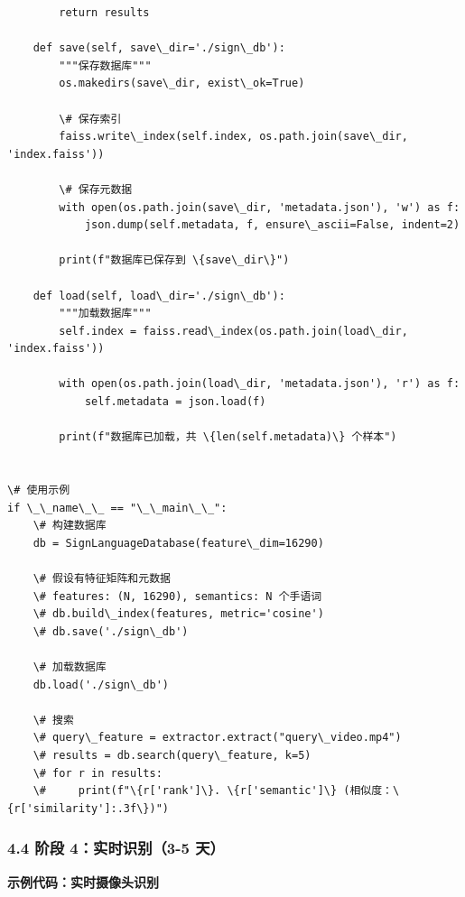 \documentclass[a4paper,12pt]{article}
\begin{document}
\begin{verbatim}
        return results
    
    def save(self, save\_dir='./sign\_db'):
        """保存数据库"""
        os.makedirs(save\_dir, exist\_ok=True)
        
        \# 保存索引
        faiss.write\_index(self.index, os.path.join(save\_dir, 'index.faiss'))
        
        \# 保存元数据
        with open(os.path.join(save\_dir, 'metadata.json'), 'w') as f:
            json.dump(self.metadata, f, ensure\_ascii=False, indent=2)
        
        print(f"数据库已保存到 \{save\_dir\}")
    
    def load(self, load\_dir='./sign\_db'):
        """加载数据库"""
        self.index = faiss.read\_index(os.path.join(load\_dir, 'index.faiss'))
        
        with open(os.path.join(load\_dir, 'metadata.json'), 'r') as f:
            self.metadata = json.load(f)
        
        print(f"数据库已加载，共 \{len(self.metadata)\} 个样本")


\# 使用示例
if \_\_name\_\_ == "\_\_main\_\_":
    \# 构建数据库
    db = SignLanguageDatabase(feature\_dim=16290)
    
    \# 假设有特征矩阵和元数据
    \# features: (N, 16290), semantics: N 个手语词
    \# db.build\_index(features, metric='cosine')
    \# db.save('./sign\_db')
    
    \# 加载数据库
    db.load('./sign\_db')
    
    \# 搜索
    \# query\_feature = extractor.extract("query\_video.mp4")
    \# results = db.search(query\_feature, k=5)
    \# for r in results:
    \#     print(f"\{r['rank']\}. \{r['semantic']\} (相似度：\{r['similarity']:.3f\})")
\end{verbatim}


\subsubsection{4.4 阶段 4：实时识别（3-5 天）}

\textbf{示例代码：实时摄像头识别}
\end{document}
